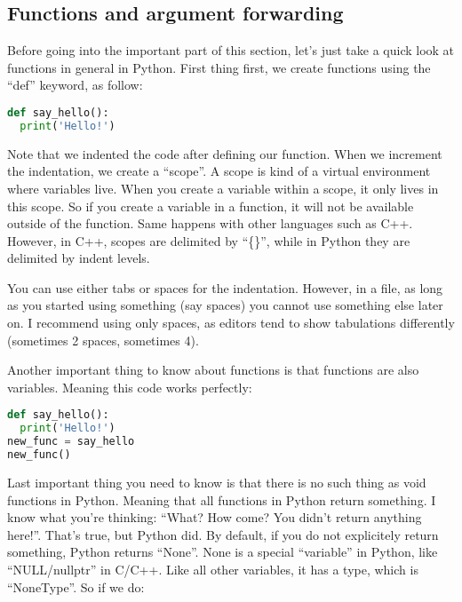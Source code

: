 \subsection{Functions and argument forwarding}
Before going into the important part of this section, let's just take a quick look
at functions in general in Python. First thing first, we create functions using
the ``def'' keyword, as follow:

\begin{lstlisting}[language=python]
def say_hello():
  print('Hello!')
\end{lstlisting}

Note that we indented the code after defining our function. When we increment the
indentation, we create a ``scope''. A scope is kind of a virtual environment where variables live.
When you create a variable within a scope, it only lives in this scope. So if you create
a variable in a function, it will not be available outside of the function. Same happens with
other languages such as C++. However, in C++, scopes are delimited by ``\{\}'', while in Python they
are delimited by indent levels.

\vspace{5mm}

You can use either tabs or spaces for the indentation. However, in a file, as long as you started
using something (say spaces) you cannot use something else later on. I recommend using only spaces,
as editors tend to show tabulations differently (sometimes 2 spaces, sometimes 4).

\vspace{5mm}

Another important thing to know about functions is that functions are also variables. Meaning this
code works perfectly:

\begin{lstlisting}[language=python]
def say_hello():
  print('Hello!')
new_func = say_hello
new_func()
\end{lstlisting}

Last important thing you need to know is that there is no such thing as void functions in Python.
Meaning that all functions in Python return something. I know what you're thinking: ``What? How come?
You didn't return anything here!''. That's true, but Python did. By default, if you do not explicitely
return something, Python returns ``None''. None is a special ``variable'' in Python,
like ``NULL/nullptr'' in C/C++. Like all other variables, it has a type, which is ``NoneType''.
So if we do:

